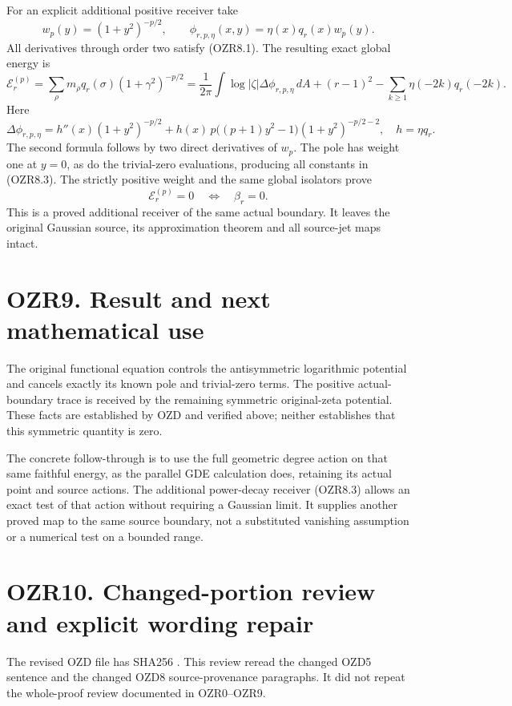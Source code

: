 For an explicit additional positive receiver take \[
w_p(y)=(1+y^2)^{-p/2},\qquad
\phi_{r,p,\eta}(x,y)=\eta(x)q_r(x)w_p(y).
\] All derivatives through order two satisfy (OZR8.1). The resulting
exact global energy is \[
\mathcal E^{(p)}_r=\sum_\rho m_\rho q_r(\sigma)(1+\gamma^2)^{-p/2}
=\frac1{2\pi}\int\log|\zeta|\Delta\phi_{r,p,\eta}\,dA
+(r-1)^2-\sum_{k\ge1}\eta(-2k)q_r(-2k).
\tag{OZR8.3}
\] Here \[
\Delta\phi_{r,p,\eta}=h''(x)(1+y^2)^{-p/2}
+h(x)\,p\bigl((p+1)y^2-1\bigr)(1+y^2)^{-p/2-2},
\quad h=\eta q_r.
\tag{OZR8.4}
\] The second formula follows by two direct derivatives of \(w_p\). The
pole has weight one at \(y=0\), as do the trivial-zero evaluations,
producing all constants in (OZR8.3). The strictly positive weight and
the same global isolators prove \[
\mathcal E^{(p)}_r=0\quad\Longleftrightarrow\quad\beta_r=0.
\tag{OZR8.5}
\] This is a proved additional receiver of the same actual boundary. It
leaves the original Gaussian source, its approximation theorem and all
source-jet maps intact.

\section{OZR9. Result and next mathematical
use}\label{ozr9.-result-and-next-mathematical-use}

The original functional equation controls the antisymmetric logarithmic
potential and cancels exactly its known pole and trivial-zero terms. The
positive actual-boundary trace is received by the remaining symmetric
original-zeta potential. These facts are established by OZD and verified
above; neither establishes that this symmetric quantity is zero.

The concrete follow-through is to use the full geometric degree action
on that same faithful energy, as the parallel GDE calculation does,
retaining its actual point and source actions. The additional
power-decay receiver (OZR8.3) allows an exact test of that action
without requiring a Gaussian limit. It supplies another proved map to
the same source boundary, not a substituted vanishing assumption or a
numerical test on a bounded range.

\section{OZR10. Changed-portion review and explicit wording
repair}\label{ozr10.-changed-portion-review-and-explicit-wording-repair}

The revised OZD file has SHA256
.
This review reread the changed OZD5 sentence and the changed OZD8
source-provenance paragraphs. It did not repeat the whole-proof review
documented in OZR0--OZR9.

